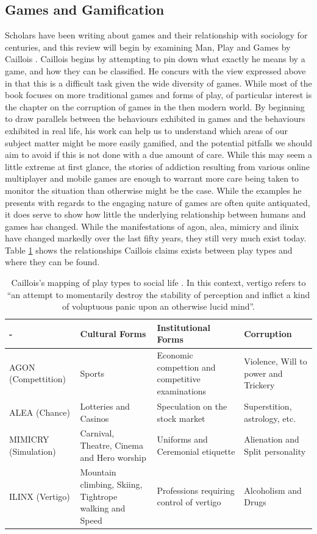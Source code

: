 \documentclass[12pt]{article}
\begin{document}
\subsection{Games and Gamification}
Scholars have been writing about games and their relationship with sociology for centuries, and this review will begin by examining Man, Play and Games by Caillois \cite{caillois1961man}. Caillois begins by attempting to pin down what exactly he means by a game, and how they can be classified. He concurs with the view expressed above in that this is a difficult task given the wide diversity of games. While most of the book focuses on more traditional games and forms of play, of particular interest is the chapter on the corruption of games in the then modern world. By beginning to draw parallels between the behaviours exhibited in games and the behaviours exhibited in real life, his work can help us to understand which areas of our subject matter might be more easily gamified, and the potential pitfalls we should aim to avoid if this is not done with a due amount of care. While this may seem a little extreme at first glance, the stories of addiction resulting from various online multiplayer and mobile games are enough to warrant more care being taken to monitor the situation than otherwise might be the case. While the examples he presents with regards to the engaging nature of games are often quite antiquated, it does serve to show how little the underlying relationship between humans and games has changed. While the manifestations of agon, alea, mimicry and ilinix have changed markedly over the last fifty years, they still very much exist today. Table \ref{table:corruption} shows the relationships Caillois claims exists between play types and where they can be found.

\begin{table}[p]
	\begin{tabular}{|p{2.0cm}|p{4.2cm}|p{4.2cm}|p{4.2cm}|}
		\hline - & Cultural Forms & Institutional Forms & Corruption \\ 
		\hline AGON (Compettition) & Sports & Economic compettion and competitive examinations & Violence, Will to power and Trickery \\ 
		\hline ALEA (Chance) & Lotteries and Casinos & Speculation on the stock market & Superstition, astrology, etc. \\ 
		\hline MIMICRY (Simulation) & Carnival, Theatre, Cinema and Hero worship & Uniforms and Ceremonial etiquette & Alienation and Split personality \\ 
		\hline ILINX (Vertigo) & Mountain climbing, Skiing, Tightrope walking and Speed & Professions requiring control of vertigo & Alcoholism and Drugs \\ 
		\hline 
	\end{tabular}
	\caption{Caillois's mapping of play types to social life \cite{caillois1961man}. In this context, vertigo refers to ``an attempt to momentarily destroy the stability of perception and inflict a kind of voluptuous panic upon an otherwise lucid mind''.}
	\label{table:corruption}
\end{table}
\end{document}
